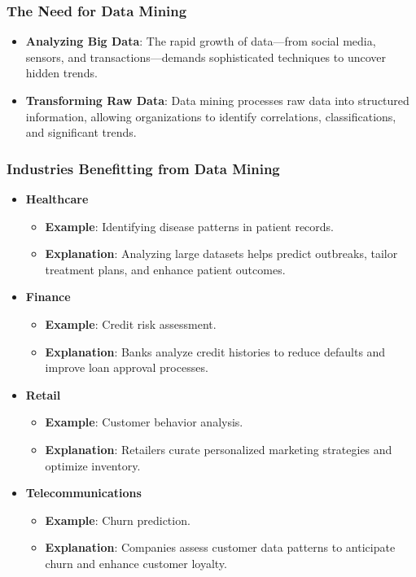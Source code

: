 \documentclass[aspectratio=169]{beamer}
\begin{document}
\begin{frame}[fragile]
    \frametitle{The Need for Data Mining}
    \begin{itemize}
        \item \textbf{Analyzing Big Data}: The rapid growth of data—from social media, sensors, and transactions—demands sophisticated techniques to uncover hidden trends. 
        \item \textbf{Transforming Raw Data}: Data mining processes raw data into structured information, allowing organizations to identify correlations, classifications, and significant trends.
    \end{itemize}
\end{frame}

\begin{frame}[fragile]
    \frametitle{Industries Benefitting from Data Mining}
    \begin{itemize}
        \item \textbf{Healthcare}
            \begin{itemize}
                \item \textbf{Example}: Identifying disease patterns in patient records.
                \item \textbf{Explanation}: Analyzing large datasets helps predict outbreaks, tailor treatment plans, and enhance patient outcomes.
            \end{itemize}
        
        \item \textbf{Finance}
            \begin{itemize}
                \item \textbf{Example}: Credit risk assessment.
                \item \textbf{Explanation}: Banks analyze credit histories to reduce defaults and improve loan approval processes.
            \end{itemize}

        \item \textbf{Retail}
            \begin{itemize}
                \item \textbf{Example}: Customer behavior analysis.
                \item \textbf{Explanation}: Retailers curate personalized marketing strategies and optimize inventory.
            \end{itemize}

        \item \textbf{Telecommunications}
            \begin{itemize}
                \item \textbf{Example}: Churn prediction.
                \item \textbf{Explanation}: Companies assess customer data patterns to anticipate churn and enhance customer loyalty.
            \end{itemize}
    \end{itemize}
\end{frame}
\end{document}
